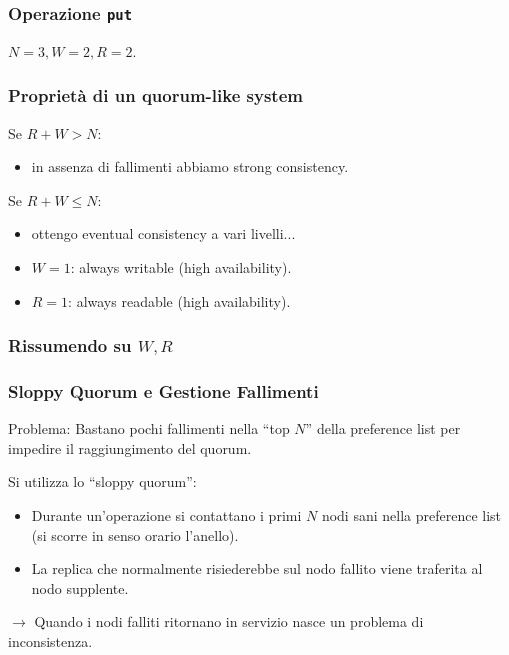 \begin{frame}
  \frametitle{Operazione \texttt{put}}
  $N = 3, W = 2, R = 2.$
\end{frame}


\begin{frame}
  \frametitle{Proprietà di un quorum-like system}
  \begin{block}{Se $R + W > N:$}
    \begin{itemize}
      \item in assenza di fallimenti abbiamo \alert{strong consistency}.
    \end{itemize}
  \end{block}
  \begin{block}{Se $R + W \leq N:$}
    \begin{itemize}
    \item ottengo \alert{eventual consistency} a vari livelli...
    \item $W = 1$: always writable (high availability).
    \item $R = 1$: always readable (high availability).
    \end{itemize}
  \end{block}
\end{frame}


\begin{frame}
  \frametitle{Rissumendo su $W, R$}
\end{frame}


\begin{frame}
  \frametitle{Sloppy Quorum e Gestione Fallimenti}
  \begin{block}{Problema:}
    Bastano pochi fallimenti nella ``top $N$'' della preference list per impedire il raggiungimento del quorum.    
  \end{block}
  \begin{block}{Si utilizza lo ``sloppy quorum'':}
  \begin{itemize}
  \item Durante un'operazione si contattano i primi $N$ nodi \alert{sani} nella preference list (si scorre in senso orario l'anello).
  \item La replica che normalmente risiederebbe sul nodo fallito viene traferita al nodo supplente.
  \end{itemize}
  \end{block}
  $\longrightarrow$ Quando i nodi falliti ritornano in servizio nasce un problema di inconsistenza. 
\end{frame}


